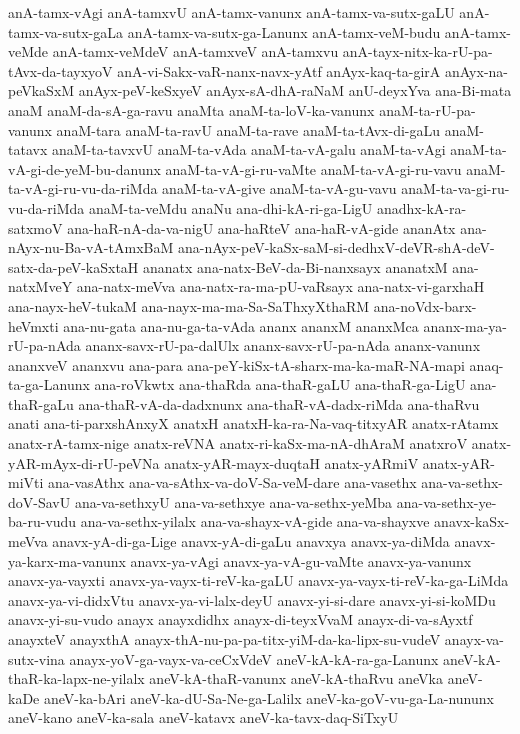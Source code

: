 {anA-tamx-vAgi
anA-tamxvU
anA-tamx-vanunx
anA-tamx-va-sutx-gaLU
anA-tamx-va-sutx-gaLa
anA-tamx-va-sutx-ga-Lanunx
anA-tamx-veM-budu
anA-tamx-veMde
anA-tamx-veMdeV
anA-tamxveV
anA-tamxvu
anA-tayx-nitx-ka-rU-pa-tAvx-da-tayxyoV
anA-vi-Sakx-vaR-nanx-navx-yAtf
anAyx-kaq-ta-girA
anAyx-na-peVkaSxM
anAyx-peV-keSxyeV
anAyx-sA-dhA-raNaM
anU-deyxYva
ana-Bi-mata
anaM
anaM-da-sA-ga-ravu
anaMta
anaM-ta-loV-ka-vanunx
anaM-ta-rU-pa-vanunx
anaM-tara
anaM-ta-ravU
anaM-ta-rave
anaM-ta-tAvx-di-gaLu
anaM-tatavx
anaM-ta-tavxvU
anaM-ta-vAda
anaM-ta-vA-galu
anaM-ta-vAgi
anaM-ta-vA-gi-de-yeM-bu-danunx
anaM-ta-vA-gi-ru-vaMte
anaM-ta-vA-gi-ru-vavu
anaM-ta-vA-gi-ru-vu-da-riMda
anaM-ta-vA-give
anaM-ta-vA-gu-vavu
anaM-ta-va-gi-ru-vu-da-riMda
anaM-ta-veMdu
anaNu
ana-dhi-kA-ri-ga-LigU
anadhx-kA-ra-satxmoV
ana-haR-nA-da-va-nigU
ana-haRteV
ana-haR-vA-gide
ananAtx
ana-nAyx-nu-Ba-vA-tAmxBaM
ana-nAyx-peV-kaSx-saM-si-dedhxV-deVR-shA-deV-satx-da-peV-kaSxtaH
ananatx
ana-natx-BeV-da-Bi-nanxsayx
ananatxM
ana-natxMveY
ana-natx-meVva
ana-natx-ra-ma-pU-vaRsayx
ana-natx-vi-garxhaH
ana-nayx-heV-tukaM
ana-nayx-ma-ma-Sa-SaThxyXthaRM
ana-noVdx-barx-heVmxti
ana-nu-gata
ana-nu-ga-ta-vAda
ananx
ananxM
ananxMca
ananx-ma-ya-rU-pa-nAda
ananx-savx-rU-pa-dalUlx
ananx-savx-rU-pa-nAda
ananx-vanunx
ananxveV
ananxvu
ana-para
ana-peY-kiSx-tA-sharx-ma-ka-maR-NA-mapi
anaq-ta-ga-Lanunx
ana-roVkwtx
ana-thaRda
ana-thaR-gaLU
ana-thaR-ga-LigU
ana-thaR-gaLu
ana-thaR-vA-da-dadxnunx
ana-thaR-vA-dadx-riMda
ana-thaRvu
anati
ana-ti-parxshAnxyX
anatxH
anatxH-ka-ra-Na-vaq-titxyAR
anatx-rAtamx
anatx-rA-tamx-nige
anatx-reVNA
anatx-ri-kaSx-ma-nA-dhAraM
anatxroV
anatx-yAR-mAyx-di-rU-peVNa
anatx-yAR-mayx-duqtaH
anatx-yARmiV
anatx-yAR-miVti
ana-vasAthx
ana-va-sAthx-va-doV-Sa-veM-dare
ana-vasethx
ana-va-sethx-doV-SavU
ana-va-sethxyU
ana-va-sethxye
ana-va-sethx-yeMba
ana-va-sethx-ye-ba-ru-vudu
ana-va-sethx-yilalx
ana-va-shayx-vA-gide
ana-va-shayxve
anavx-kaSx-meVva
anavx-yA-di-ga-Lige
anavx-yA-di-gaLu
anavxya
anavx-ya-diMda
anavx-ya-karx-ma-vanunx
anavx-ya-vAgi
anavx-ya-vA-gu-vaMte
anavx-ya-vanunx
anavx-ya-vayxti
anavx-ya-vayx-ti-reV-ka-gaLU
anavx-ya-vayx-ti-reV-ka-ga-LiMda
anavx-ya-vi-didxVtu
anavx-ya-vi-lalx-deyU
anavx-yi-si-dare
anavx-yi-si-koMDu
anavx-yi-su-vudo
anayx
anayxdidhx
anayx-di-teyxVvaM
anayx-di-va-sAyxtf
anayxteV
anayxthA
anayx-thA-nu-pa-pa-titx-yiM-da-ka-lipx-su-vudeV
anayx-va-sutx-vina
anayx-yoV-ga-vayx-va-ceCxVdeV
aneV-kA-kA-ra-ga-Lanunx
aneV-kA-thaR-ka-lapx-ne-yilalx
aneV-kA-thaR-vanunx
aneV-kA-thaRvu
aneVka
aneV-kaDe
aneV-ka-bAri
aneV-ka-dU-Sa-Ne-ga-Lalilx
aneV-ka-goV-vu-ga-La-nununx
aneV-kano
aneV-ka-sala
aneV-katavx
aneV-ka-tavx-daq-SiTxyU
}

